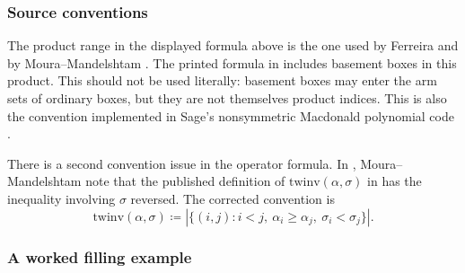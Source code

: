 \subsubsection[permutedBasementMacdonaldConventions]{Source conventions}

\begin{remark}
The product range in the displayed formula above is the one used
by Ferreira and by Moura--Mandelshtam
\cite[Def.~2.1]{MouraMandelshtam2026x}.  The printed formula in
\cite[Def.~5]{Alexandersson2015gbMacdonald} includes basement boxes in this
product.  This should not be used literally: basement boxes may enter the arm
sets of ordinary boxes, but they are not themselves product indices.  This is
also the convention implemented in
Sage's nonsymmetric Macdonald polynomial code \cite{Sage}.

There is a second convention issue in the operator formula.  In
\cite[Rem.~2.7]{MouraMandelshtam2025x}, Moura--Mandelshtam note that the
published definition of $\mathrm{twinv}(\alpha,\sigma)$ in
\cite{Alexandersson2015gbMacdonald} has the inequality involving $\sigma$
reversed.  The corrected convention is
\[
\mathrm{twinv}(\alpha,\sigma)
\coloneqq
\left|\{(i,j): i<j,\ \alpha_i\geq\alpha_j,\ \sigma_i<\sigma_j\}\right|.
\]
\end{remark}

\subsubsection[permutedBasementMacdonaldExample]{A worked filling example}

